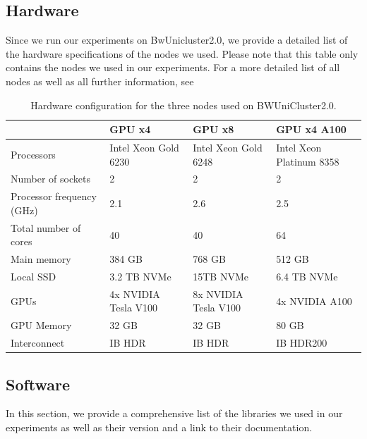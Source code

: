 \subsection{Hardware}
\label{sec:Appendix:Hardware}
Since we run our experiments on BwUnicluster2.0, we provide a detailed list of the hardware specifications of the nodes we used. Please
note that this table only contains the nodes we used in our experiments. For a more detailed list of all nodes as well as all further
information, see \cite{bwUniclusterHardware}

\newpage

\begin{table}[!htb]
    \begin{tabularx}{\textwidth}{|X || X | X | X|} 
        \hline
         & GPU x4 & GPU x8 & GPU x4 A100 \\ 
        \hline
        \hline 
        Processors & Intel Xeon Gold 6230 & Intel Xeon Gold 6248 & Intel Xeon Platinum 8358  \\ 
        \hline
        Number of sockets & 2 & 2 & 2  \\ 
        \hline
        Processor frequency (GHz) & 2.1 & 2.6 & 2.5  \\ 
        \hline
        Total number of cores & 40 & 40 & 64  \\ 
        \hline
        Main memory & 384 GB & 768 GB & 512 GB  \\ 
        \hline
        Local SSD & 3.2 TB NVMe & 15TB NVMe & 6.4 TB NVMe  \\ 
        \hline
        GPUs & 4x NVIDIA Tesla V100 & 8x NVIDIA Tesla V100 & 4x NVIDIA A100  \\ 
        \hline
        GPU Memory & 32 GB  & 32 GB & 80 GB  \\ 
        \hline
        Interconnect & IB HDR & IB HDR & IB HDR200  \\ 
        \hline
    \end{tabularx}
    \caption{Hardware configuration for the three nodes used on BWUniCluster2.0. }
    \label{fig:HardwareSpec}
\end{table}


\subsection{Software}
\label{sec:Appendix:Software}
In this section, we provide a comprehensive list of the libraries we used in our experiments as well as their version
and a link to their documentation.

